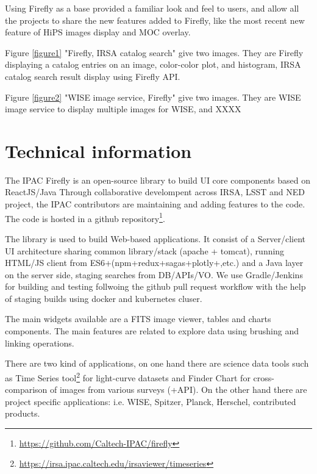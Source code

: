 \documentclass[11pt,twoside]{article}
\begin{document}
Using Firefly as a base provided a familiar look and feel to users, and allow all the projects to share the new features added to Firefly, like the most recent new feature of HiPS images display and MOC overlay.

Figure \ref{figure1} "Firefly, IRSA catalog search" give two images. They are Firefly displaying a catalog entries on an image, color-color plot, and histogram,
IRSA catalog search result display using Firefly API.

Figure \ref{figure2} "WISE image service, Firefly" give two images. They are WISE image service to display multiple images for WISE, and XXXX


\smallskip
\smallskip

\section{Technical information}

The IPAC Firefly is an open-source library to build UI core components based on ReactJS/Java Through collaborative develompent across IRSA, LSST and NED project, the IPAC contributors are maintaining and adding features to the code.
The code is hosted in a github repository\footnote{\url{https://github.com/Caltech-IPAC/firefly}}.

The library is used to build Web-based applications. It consist of a Server/client UI architecture sharing common library/stack (apache + tomcat), running HTML/JS client from ES6+(npm+redux+sagas+plotly+,etc.) and a Java layer on the server side, staging searches from DB/APIs/VO. We use Gradle/Jenkins for building and testing follwoing the github pull request workflow with the help of staging builds using docker and kubernetes cluser.

The main widgets available are a FITS image viewer, tables and charts components. The main features are related to explore data using brushing and linking operations.

There are two kind of applications, on one hand there are science data tools such as Time Series tool\footnote{\url{https://irsa.ipac.caltech.edu/irsaviewer/timeseries}} for light-curve datasets and Finder Chart for cross-comparison of images from various surveys (+API).
On the other hand there are project specific applications: i.e. WISE, Spitzer, Planck, Herschel, contributed products.
\end{document}
